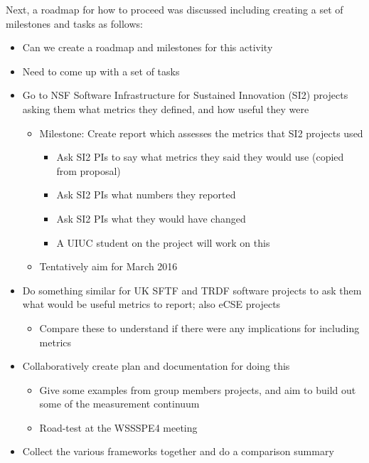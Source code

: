 \smallskip
\noindent
Next, a roadmap for how to proceed was discussed including creating a set of
milestones and tasks as follows:
\begin{itemize}
\item
Can we create a roadmap and milestones for this activity

\item
Need to come up with a set of tasks

\item
Go to NSF Software Infrastructure for Sustained Innovation (SI2) projects asking
them what metrics they defined, and how useful they were

\begin{itemize}
\item
        Milestone: Create report which assesses the metrics that SI2 projects used

\begin{itemize}
\item
Ask SI2 PIs to say what metrics they said they would use (copied from proposal)
\item
                Ask SI2 PIs what numbers they reported

\item
                Ask SI2 PIs what they would have changed

\item
                A UIUC student on the project will work on this
\end{itemize}

\item
        Tentatively aim for March 2016
\end{itemize}

\item
Do something similar for UK SFTF and TRDF software projects to ask them what
would be useful metrics to report; also eCSE projects

\begin{itemize}
\item
        Compare these to understand if there were any implications for including metrics
\end{itemize}

\item
Collaboratively create plan and documentation for doing this

\begin{itemize}
\item
Give some examples from group members projects, and aim to build out some of the
measurement continuum

\item
        Road-test at the WSSSPE4 meeting
\end{itemize}

\item
Collect the various frameworks together and do a comparison summary

\end{itemize}

